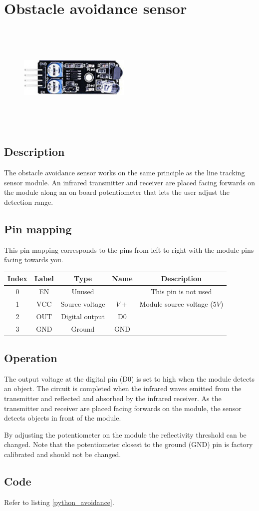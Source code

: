 \section{Obstacle avoidance sensor}
\begin{figure}[H]
    \centering
    \includegraphics[angle=0, keepaspectratio=true, scale=1, width=200px, height=200px]{images/obstacle_avoidance.jpg}
\end{figure}
\subsection*{Description}
The obstacle avoidance sensor works on the same principle as the line tracking sensor module. An infrared transmitter and receiver are placed facing forwards on the module along an on board potentiometer that lets the user adjust the detection range.
\subsection*{Pin mapping}
This pin mapping corresponds to the pins from left to right with the module pins facing towards you.
\begin{table}[H]
    \centering
    \begin{tabular}{|c|c|c|c|c|}
    \hline
    Index &Label &Type &Name &Description\\ \hline
    0 &EN &Unused & &This pin is not used \\ \hline
    1 &VCC &Source voltage &$V+$ &Module source voltage ($5V$)\\ \hline
    2 &OUT &Digital output &D0 &\\ \hline
    3 &GND &Ground &GND &\\ \hline
    \end{tabular}
\end{table}
\subsection*{Operation}
The output voltage at the digital pin (D0) is set to high when the module detects an object. The circuit is completed when the infrared waves emitted from the transmitter and reflected and absorbed by the infrared receiver. As the transmitter and receiver are placed facing forwards on the module, the sensor detects objects in front of the module.

By adjusting the potentiometer on the module the reflectivity threshold can be changed. Note that the potentiometer closest to the ground (GND) pin is factory calibrated and should not be changed.
\subsection*{Code}
Refer to listing \ref{python_avoidance}.